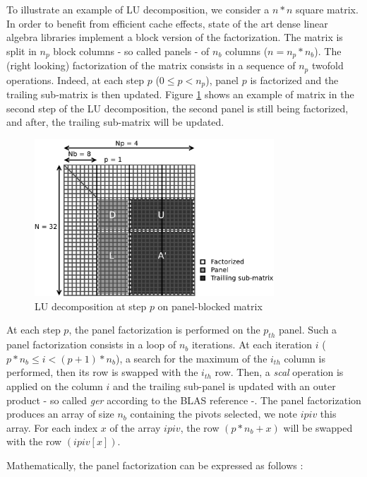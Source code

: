 To illustrate an example of LU decomposition, we consider a $n*n$ square matrix. In order to benefit from efficient cache effects, state of the art dense linear algebra libraries implement a block version of the factorization. The matrix is split in $n_p$ block columns - so called panels - of $n_b$ columns ($n = n_p * n_b$). The (right looking) factorization of the matrix consists in a sequence of $n_p$ twofold operations. Indeed, at each step $p$ ($0 \leq p < n_p$), panel $p$ is factorized and the trailing sub-matrix is then updated. Figure \ref{fig:matrix} shows an example of matrix in the second step of the LU decomposition, the second panel is still being factorized, and after, the trailing sub-matrix will be updated.

\begin{figure}[!ht]
\centering
\includegraphics[width=0.8\textwidth]{figures/panel_matrix_bw.pdf}
\caption{LU decomposition at step $p$ on panel-blocked matrix \label{fig:matrix}}
\end{figure}

 
At each step $p$, the panel factorization is performed on the $p_{th}$ panel. Such a panel factorization consists in a loop of $n_b$ iterations. At each iteration $i$ ($p*n_b \leq i < (p+1)*n_b$), a search for the maximum of the $i_{th}$ column is performed, then its row is swapped with the $i_{th}$ row.
Then, a \textit{scal} operation is applied on the column $i$ and the trailing sub-panel is updated with an outer product - so called \textit{ger} according to the BLAS reference -. The panel factorization produces an array of size $n_b$ containing the pivots selected, we note $ipiv$ this array. For each index $x$ of the array $ipiv$, the row $(p*n_b + x)$ will be swapped with the row $(ipiv[x])$.

Mathematically, the panel factorization can be expressed as follows :

